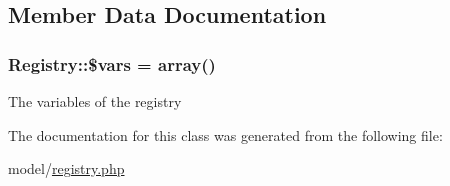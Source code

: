 \subsection{Member Data Documentation}
\hypertarget{classRegistry_accb4d60e10b7d212a3097ab4c6d86a9d}{
\subsubsection[{\$vars}]{\setlength{\rightskip}{0pt plus 5cm}Registry\-::\$vars = array()}}\label{classRegistry_accb4d60e10b7d212a3097ab4c6d86a9d}
The variables of the registry 

The documentation for this class was generated from the following file\-:\begin{DoxyCompactItemize}
\item 
model/\hyperlink{registry_8php}{registry.\-php}\end{DoxyCompactItemize}
